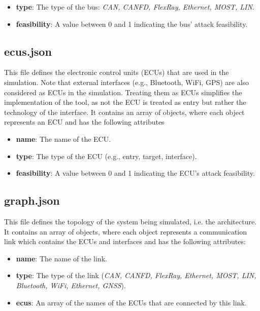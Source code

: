 \begin{itemize}
\item \textbf{type}: The type of the bus: \textit{CAN, CANFD, FlexRay, Ethernet, MOST, LIN}.
\item \textbf{feasibility}: A value between 0 and 1 indicating the bus' attack feasibility.
\end{itemize}

\subsection{ecus.json}
\label{sec:ecus}

This file defines the electronic control units (ECUs) that are used in the simulation. 
Note that external interfaces (e.g., Bluetooth, WiFi, GPS) are also considered as ECUs in the simulation.
Treating them as ECUs simplifies the implementation of the tool, as not the ECU is treated as entry but rather the technology of the interface.
It contains an array of objects, where each object represents an ECU and has the following attributes

\begin{itemize}
\item \textbf{name}: The name of the ECU.
\item \textbf{type}: The type of the ECU (e.g., entry, target, interface).
\item \textbf{feasibility}: A value between 0 and 1 indicating the ECU's attack feasibility.
\end{itemize}

\subsection{graph.json}
\label{sec:graph}

This file defines the topology of the system being simulated, i.e. the architecture. 
It contains an array of objects, where each object represents a communication link which contains the ECUs and interfaces and has the following attributes:

\begin{itemize}
\item \textbf{name}: The name of the link.
\item \textbf{type}: The type of the link (\textit{CAN, CANFD, FlexRay, Ethernet, MOST, LIN, Bluetooth, WiFi, Ethernet, GNSS}).
\item \textbf{ecus}: An array of the names of the ECUs that are connected by this link.
\end{itemize}


